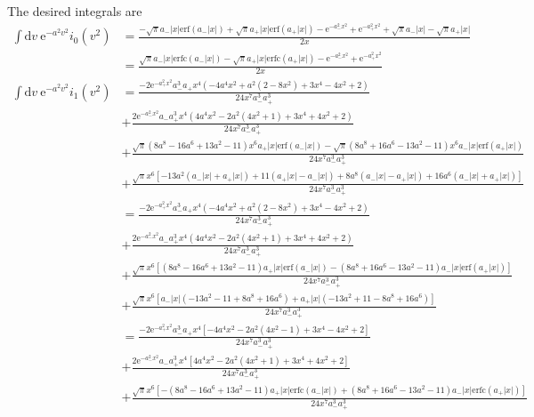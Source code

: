 \documentclass[paper=a4, fontsize=11pt]{article} %
\numberwithin{equation}{section} %
\numberwithin{figure}{section} %
\numberwithin{table}{section} %
\newcommand{\re}{{\mathrm{e}}}
\newcommand{\rerf}{{\mathrm{erf}}}
\newcommand{\rerfc}{{\mathrm{erfc}}}
\newcommand{\rd}{{\mathrm{d}}}
\begin{document}
The desired integrals are 
\begin{equation}
\begin{split}
\int \rd v\ \re^{-a^2 v^2}i_{0}(v^2)
&= \frac{-\sqrt{\pi} a_{-}|x| \rerf(a_{-}|x|) 
+ \sqrt{\pi} a_{+}|x| \rerf(a_{+}|x|)
- \re^{-a_{-}^2 x^2} + \re^{-a_{+}^2 x^2} 
+ \sqrt{\pi}a_{-}|x| 
- \sqrt{\pi}a_{+}|x|}{2 x}\\
&= \frac{\sqrt{\pi} a_{-}|x| \rerfc(a_{-}|x|) 
- \sqrt{\pi} a_{+}|x| \rerfc(a_{+}|x|)
- \re^{-a_{-}^2 x^2} + \re^{-a_{+}^2 x^2} }{2 x}\\
\int \rd v\ \re^{-a^2 v^2}i_{1}(v^2)
&= \frac{-2 \re^{-a_{+}^2 x^2} a_{-}^3 a_{+} x^4 (-4 a^4 x^2 + a^2 (2 - 8 x^2) + 3 x^4 - 4 x^2 + 2) }{24 x^7 a_{-}^3 a_{+}^3}\\
&+ \frac{2 \re^{-a_{-}^2 x^2} a_{-} a_{+}^3 x^4 (4 a^4 x^2 - 2 a^2 (4 x^2 + 1) + 3 x^4 + 4 x^2 + 2)}{24 x^7 a_{-}^3 a_{+}^3}\\
&+ \frac{\sqrt{\pi} (8 a^8 - 16 a^6 + 13 a^2 - 11) x^6 a_{+} |x| \rerf(a_{-} |x|) - \sqrt{\pi} (8 a^8 + 16 a^6 - 13 a^2 - 11) x^6 a_{-} |x|\rerf(a_{+} |x|)}{24 x^7 a_{-}^3 a_{+}^3}\\
&+ \frac{\sqrt{\pi} x^6 \left[-13 a^2 (a_{-} |x| + a_{+} |x|) + 11 (a_{+} |x| - a_{-} |x|) + 8 a^8 (a_{-} |x| - a_{+} |x| ) + 16 a^6 (a_{-} |x| + a_{+} |x|)\right]}{24 x^7 a_{-}^3 a_{+}^3}\\
&= \frac{-2 \re^{-a_{+}^2 x^2} a_{-}^3 a_{+} x^4 (-4 a^4 x^2 + a^2 (2 - 8 x^2) + 3 x^4 - 4 x^2 + 2) }{24 x^7 a_{-}^3 a_{+}^3}\\
&+ \frac{2 \re^{-a_{-}^2 x^2} a_{-} a_{+}^3 x^4 (4 a^4 x^2 - 2 a^2 (4 x^2 + 1) + 3 x^4 + 4 x^2 + 2)}{24 x^7 a_{-}^3 a_{+}^3}\\
&+ \frac{\sqrt{\pi} x^6 \left[(8 a^8 - 16 a^6 + 13 a^2 - 11) a_{+} |x| \rerf(a_{-} |x|) - (8 a^8 + 16 a^6 - 13 a^2 - 11) a_{-} |x|\rerf(a_{+} |x|)\right]}{24 x^7 a_{-}^3 a_{+}^3}\\
&+ \frac{\sqrt{\pi}x^6\left[a_{-}|x|\left(-13a^2 - 11 + 8a^8 +16a^6 \right) + a_{+}|x|\left(-13a^2 + 11 - 8a^8 +16a^6\right)\right]}{24 x^7 a_{-}^3 a_{+}^3}\\
&= \frac{-2 \re^{-a_{+}^2 x^2} a_{-}^3 a_{+} x^4 \left[-4 a^4 x^2 - 2a^2 (4 x^2 - 1) + 3 x^4 - 4 x^2 + 2\right] }{24 x^7 a_{-}^3 a_{+}^3}\\
&+ \frac{2 \re^{-a_{-}^2 x^2} a_{-} a_{+}^3 x^4 \left[4 a^4 x^2 - 2 a^2 (4 x^2 + 1) + 3 x^4 + 4 x^2 + 2\right]}{24 x^7 a_{-}^3 a_{+}^3}\\
&+ \frac{\sqrt{\pi} x^6 \left[-(8 a^8 - 16 a^6 + 13 a^2 - 11) a_{+} |x| \rerfc(a_{-} |x|) + (8 a^8 + 16 a^6 - 13 a^2 - 11) a_{-} |x|\rerfc(a_{+} |x|)\right]}{24 x^7 a_{-}^3 a_{+}^3}\\

\end{split}
\end{equation}
\end{document}
